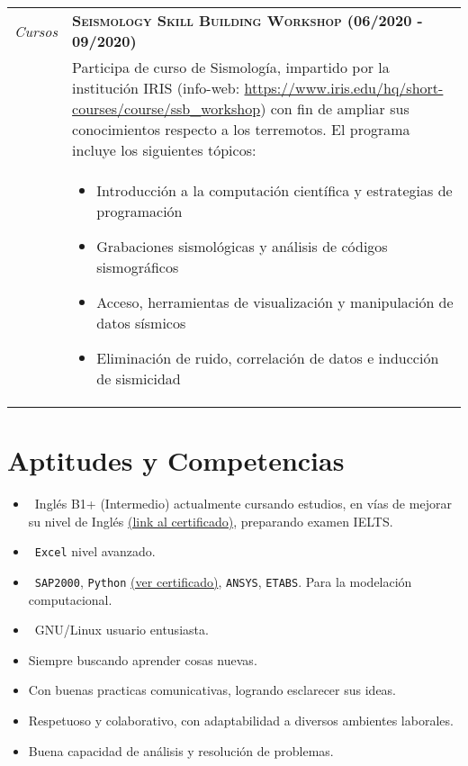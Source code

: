 \documentclass[latterpaper]{article}
\newenvironment{twocollist}{
    \begin{multicols}{2}
    \begin{itemize}
    }{
    \end{itemize}
    \end{multicols}
}
\begin{document}
\begin{tabular}{r p{14.0 cm}}	
\emph{\phantom{cincó}Cursos} & \textbf{\textsc{Seismology Skill Building Workshop (06/2020 - 09/2020)}}\\
& Participa de curso de Sismología, impartido por la institución IRIS (info-web: \url{https://www.iris.edu/hq/short-courses/course/ssb_workshop}) con fin de ampliar sus conocimientos respecto a los terremotos. El programa incluye los siguientes tópicos:\\
&
\begin{itemize}
\item Introducción a la computación científica y estrategias de programación
\item Grabaciones sismológicas y análisis de códigos sismográficos
\item Acceso, herramientas de visualización y manipulación de datos sísmicos
\item Eliminación de ruido, correlación de datos e inducción de sismicidad
  \end{itemize}\\
  \end{tabular}

\section{Aptitudes y Competencias}

  \begin{twocollist}
            \item \faLanguage~Inglés B1+ (Intermedio) actualmente cursando estudios, en vías de mejorar su nivel de Inglés \href{https://github.com/Inav92/CV_Resume/raw/master/certificados/certificate_Ivan\%20Alejandro_B1_48364.pdf}{(link al certificado)}, preparando examen IELTS.
            \item \faFileExcelO~\texttt{Excel} nivel avanzado.
            \item \faCode~\texttt{SAP2000}, \texttt{Python} \href{https://github.com/Inav92/CV_Resume/blob/master/certificados/certificate_Ivan\%20Alejandro_B1_48364.pdf}{(ver certificado)}, \texttt{ANSYS}, \texttt{ETABS}. Para la modelación computacional.
            \item \faLinux~GNU/Linux usuario entusiasta.
            \item Siempre buscando aprender cosas nuevas.
            \item Con buenas practicas comunicativas, logrando esclarecer sus ideas.
            \item Respetuoso y colaborativo, con adaptabilidad a diversos ambientes laborales.
            \item Buena capacidad de análisis y resolución de problemas.
  \end{twocollist}
\end{document}
